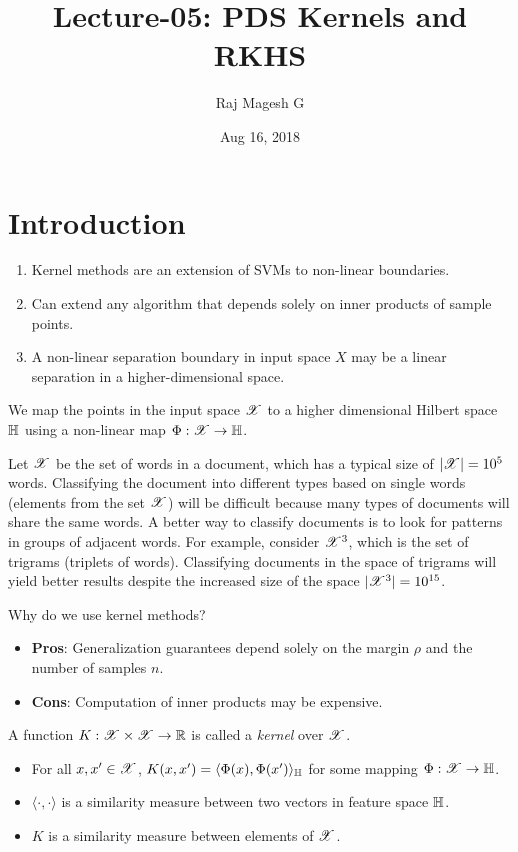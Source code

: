 \documentclass[a4paper,english,12pt]{article}
\title{Lecture-05: PDS Kernels and RKHS}
\date{Aug 16, 2018}
\author{Raj Magesh G}
\begin{document}
\maketitle
\section{Introduction}

\begin{enumerate}
\item Kernel methods are an extension of SVMs to non-linear boundaries.
\item Can extend any algorithm that depends solely on inner products of sample points.
\item A non-linear separation boundary in input space $X$ may be a linear separation in a higher-dimensional space.
\end{enumerate}
We map the points in the input space $\mathscr{X}$ to a higher dimensional Hilbert space $\mathbb{H}$ using a non-linear map $\Phi : \mathscr{X} \to \mathbb{H}$. 


\begin{exmp} 
Let $\mathscr{X}$ be the set of words in a document, which has a typical size of $|\mathscr{X}| = 10^5$ words. 
Classifying the document into different types based on single words (elements from the set $\mathscr{X}$) will be difficult because many types of documents will share the same words. 
A better way to classify documents is to look for patterns in groups of adjacent words. 
For example, consider $\mathscr{X}^3$, which is the set of trigrams (triplets of words). Classifying documents in the space of trigrams will yield better results despite the increased size of the space $|\mathscr{X}^3| = 10^{15}$.
\end{exmp}

\begin{rem}
Why do we use kernel methods?
\begin{itemize}
	\item \textbf{Pros}: Generalization guarantees depend solely on the margin $\rho$ and the number of samples $n$.
	\item \textbf{Cons}: Computation of inner products may be expensive.
\end{itemize}
\end{rem}

\begin{defn}
	A function $K : \mathscr{X} \times \mathscr{X} \to \mathbb{R}$ is called a \textit{kernel} over $\mathscr{X}$.
\begin{itemize}
	\item For all $x, x' \in \mathscr{X}$, $K(x, x') = \langle \Phi(x), \Phi(x') \rangle_{\mathbb{H}}$ for some mapping $\Phi : \mathscr{X} \to \mathbb{H}$.
	\item $\langle \cdot, \cdot \rangle$ is a similarity measure between two vectors in feature space $\mathbb{H}$.
	\item $K$ is a similarity measure between elements of $\mathscr{X}$.	
\end{itemize}
\end{defn}
\end{document}
